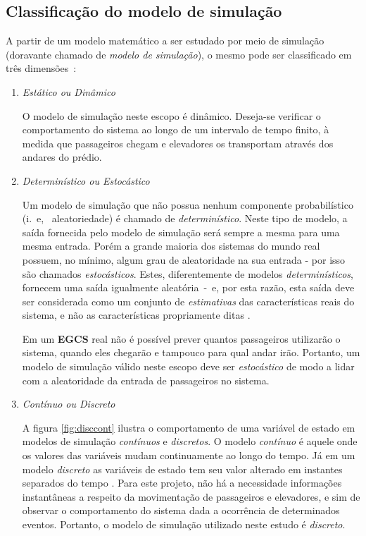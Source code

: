 \subsection{\label{simulator:motivation:classification}Classificação do modelo de simulação}

A partir de um modelo matemático a ser estudado por meio de simulação (doravante
chamado de \textit{modelo de simulação}), o mesmo pode ser classificado em três
dimensões~\cite{Banks,Law}:

\begin{enumerate}
\item \textit{Estático ou Dinâmico}

O modelo de simulação neste escopo é dinâmico. Deseja-se verificar o
comportamento do sistema ao longo de um intervalo de tempo finito, à medida que
passageiros chegam e elevadores os transportam através dos andares do prédio.

\item \textit{Determinístico ou Estocástico}

Um modelo de simulação que não possua nenhum componente probabilístico (i.~e,~
aleatoriedade) é chamado de \textit{determinístico}. Neste tipo de modelo, a
saída fornecida pelo modelo de simulação será sempre a mesma para uma mesma
entrada. Porém a grande maioria dos sistemas do mundo real possuem, no mínimo,
algum grau de aleatoridade na sua entrada - por isso são chamados
\textit{estocásticos}. Estes, diferentemente de modelos
\textit{determinísticos}, fornecem uma saída igualmente aleatória~-~e, por esta
razão, esta saída deve ser considerada como um conjunto de \textit{estimativas}
das características reais do sistema, e não as características propriamente
ditas \cite{Banks}.

Em um \textbf{EGCS} real não é possível prever quantos passageiros utilizarão o
sistema, quando eles chegarão e tampouco para qual andar irão. Portanto, um
modelo de simulação válido neste escopo deve ser \textit{estocástico} de modo a
lidar com a aleatoridade da entrada de passageiros no sistema.


\item \textit{Contínuo ou Discreto}

A figura \ref{fig:disccont} ilustra o comportamento de uma variável de estado em
modelos de simulação \textit{contínuos} e \textit{discretos}. O modelo
\textit{contínuo} é aquele onde os valores das variáveis mudam continuamente ao
longo do tempo. Já em um modelo \textit{discreto} as variáveis de estado tem seu
valor alterado em instantes separados do tempo \cite{Banks}. Para este projeto,
não há a necessidade informações instantâneas a respeito da movimentação de
passageiros e elevadores, e sim de observar o comportamento do sistema dada a
ocorrência de determinados eventos. Portanto, o modelo de simulação utilizado
neste estudo é \textit{discreto}.


\end{enumerate}
